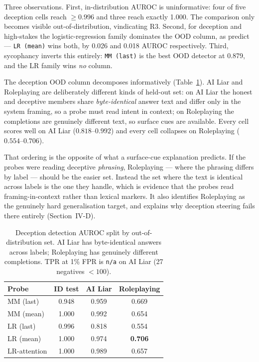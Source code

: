 \documentclass[conference]{IEEEtran}
\begin{document}
Three observations. First, in-distribution AUROC is uninformative: four of five
deception cells reach $\geq 0.996$ and three reach exactly 1.000. The
comparison only becomes visible out-of-distribution, vindicating R3. Second, for
deception and high-stakes the logistic-regression family dominates the OOD
column, as \citeauthor{goldowsky2025} predict --- \texttt{LR (mean)} wins both,
by 0.026 and 0.018 AUROC respectively. Third, sycophancy inverts this entirely:
\texttt{MM (last)} is the best OOD detector at 0.879, and the LR family wins
\emph{no} column.

The deception OOD column decomposes informatively (Table~\ref{tab:decood}). AI
Liar and Roleplaying are deliberately different kinds of held-out set: on AI
Liar the honest and deceptive members share \emph{byte-identical} answer text
and differ only in the system framing, so a probe must read intent in context;
on Roleplaying the completions are genuinely different text, so surface cues are
available. Every cell scores well on AI Liar ($0.818$--$0.992$) and every cell
collapses on Roleplaying ($0.554$--$0.706$).

That ordering is the opposite of what a surface-cue explanation predicts. If the
probes were reading deceptive \emph{phrasing}, Roleplaying --- where the
phrasing differs by label --- should be the easier set. Instead the set where
the text is identical across labels is the one they handle, which is evidence
that the probes read framing-in-context rather than lexical markers. It also
identifies Roleplaying as the genuinely hard generalisation target, and explains
why deception steering fails there entirely (Section~IV-D).

\begin{table}[t]
\caption{Deception detection AUROC split by out-of-distribution set. AI Liar has
byte-identical answers across labels; Roleplaying has genuinely different
completions. TPR at 1\% FPR is \texttt{n/a} on AI Liar (27 negatives $<100$).}
\label{tab:decood}
\centering
\small
\begin{tabular}{lccc}
\toprule
Probe & ID test & AI Liar & Roleplaying \\
\midrule
MM (last)     & 0.948 & 0.959 & 0.669 \\
MM (mean)     & 1.000 & 0.992 & 0.654 \\
LR (last)     & 0.996 & 0.818 & 0.554 \\
LR (mean)     & 1.000 & 0.974 & \textbf{0.706} \\
LR-attention  & 1.000 & 0.989 & 0.657 \\
\bottomrule
\end{tabular}
\end{table}
\end{document}
